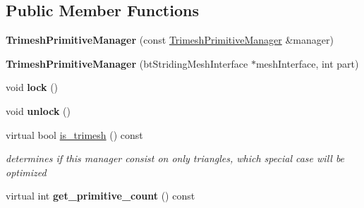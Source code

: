 \subsection*{Public Member Functions}
\begin{DoxyCompactItemize}
\item 
\mbox{\label{classbtGImpactMeshShapePart_1_1TrimeshPrimitiveManager_ac2132d17cd0eaab2deee81783492ea34}} 
{\bfseries Trimesh\+Primitive\+Manager} (const \hyperlink{classbtGImpactMeshShapePart_1_1TrimeshPrimitiveManager}{Trimesh\+Primitive\+Manager} \&manager)
\item 
\mbox{\label{classbtGImpactMeshShapePart_1_1TrimeshPrimitiveManager_a2e8cb2bb12d4a52d99f10afbb2a5c06f}} 
{\bfseries Trimesh\+Primitive\+Manager} (bt\+Striding\+Mesh\+Interface $\ast$mesh\+Interface, int part)
\item 
\mbox{\label{classbtGImpactMeshShapePart_1_1TrimeshPrimitiveManager_a48a013e72b76f832638a54326a7cc709}} 
void {\bfseries lock} ()
\item 
\mbox{\label{classbtGImpactMeshShapePart_1_1TrimeshPrimitiveManager_aaa44d0463dfc7e66e203ede074db17ed}} 
void {\bfseries unlock} ()
\item 
\mbox{\label{classbtGImpactMeshShapePart_1_1TrimeshPrimitiveManager_ab6653df67e4563e23a15528916826375}} 
virtual bool \hyperlink{classbtGImpactMeshShapePart_1_1TrimeshPrimitiveManager_ab6653df67e4563e23a15528916826375}{is\+\_\+trimesh} () const
\begin{DoxyCompactList}\small\item\em determines if this manager consist on only triangles, which special case will be optimized \end{DoxyCompactList}\item 
\mbox{\label{classbtGImpactMeshShapePart_1_1TrimeshPrimitiveManager_a3dd197e6b8d45058edbec0a974fa2dfc}} 
virtual int {\bfseries get\+\_\+primitive\+\_\+count} () const
\item 

\end{DoxyCompactItemize}
